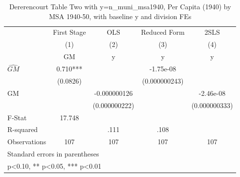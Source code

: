 \begin{table}[htbp]\centering
\def\sym#1{\ifmmode^{#1}\else\(^{#1}\)\fi}
\caption{Dererencourt Table Two with y=n\_muni\_msa1940, Per Capita (1940) by MSA 1940-50, with baseline y and division FEs}
\begin{tabular}{l*{4}{c}}
\toprule
                    & First Stage   &         OLS   &Reduced Form   &        2SLS   \\
                    &\multicolumn{1}{c}{(1)}&\multicolumn{1}{c}{(2)}&\multicolumn{1}{c}{(3)}&\multicolumn{1}{c}{(4)}\\
                    &\multicolumn{1}{c}{GM}&\multicolumn{1}{c}{y}&\multicolumn{1}{c}{y}&\multicolumn{1}{c}{y}\\
\midrule
$\hat{GM}$          &       0.710***&               &   -1.75e-08   &               \\
                    &    (0.0826)   &               &(0.000000243)   &               \\
\addlinespace
GM                  &               &-0.000000126   &               &   -2.46e-08   \\
                    &               &(0.000000222)   &               &(0.000000333)   \\
\midrule
F-Stat              &      17.748   &               &               &               \\
R-squared           &               &        .111   &        .108   &               \\
Observations        &         107   &         107   &         107   &         107   \\
\bottomrule
\multicolumn{5}{l}{\footnotesize Standard errors in parentheses}\\
\multicolumn{5}{l}{\footnotesize * p<0.10, ** p<0.05, *** p<0.01}\\
\end{tabular}
\end{table}
